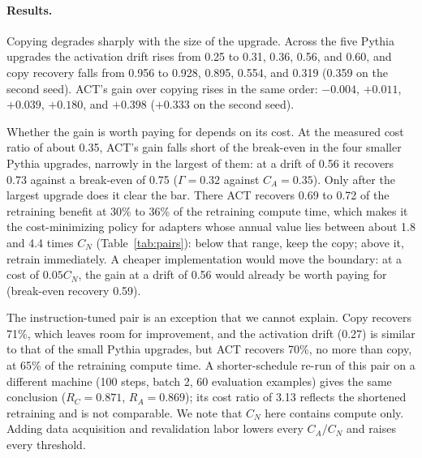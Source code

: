 \documentclass[ijoc,nonblindrev]{informs4}
\begin{document}
\paragraph{Results.} Copying degrades sharply with the size of the upgrade. Across the five Pythia upgrades the activation drift rises from 0.25 to 0.31, 0.36, 0.56, and 0.60, and
copy recovery falls from 0.956 to 0.928, 0.895, 0.554, and 0.319 (0.359 on the second seed). ACT's gain over copying rises in the same order: $-0.004$, $+0.011$, $+0.039$, $+0.180$, and $+0.398$ ($+0.333$ on the second seed).

Whether the gain is worth paying for depends on its cost. At the measured cost ratio of about 0.35, ACT's gain falls short of the break-even in the four smaller Pythia upgrades, narrowly in the largest of them: at a drift of 0.56 it recovers 0.73 against a break-even of 0.75 ($\Gamma=0.32$ against $C_A=0.35$).
Only after the largest upgrade does it clear the bar. There ACT recovers 0.69 to 0.72 of the retraining benefit at 30\% to 36\% of the retraining compute time, which makes it the cost-minimizing policy for adapters
whose annual value lies between about 1.8 and 4.4 times $C_N$ (Table~\ref{tab:pairs}): below that range, keep the copy; above it, retrain immediately. A cheaper implementation would move the boundary: at a cost of $0.05C_N$, the gain at a drift of 0.56 would already be worth paying for (break-even recovery 0.59).

The instruction-tuned pair is an exception that we cannot explain. Copy recovers 71\%, which leaves room for improvement, and the activation drift (0.27) is similar to that of the small Pythia upgrades, but ACT recovers 70\%, no more than copy, at 65\% of the retraining compute time.
A shorter-schedule re-run of this pair on a different machine (100 steps, batch 2, 60 evaluation examples) gives the same conclusion ($R_C=0.871$, $R_A=0.869$); its cost ratio of 3.13 reflects the shortened retraining and is not comparable.
We note that $C_N$ here contains compute only. Adding data acquisition and revalidation labor lowers every $C_A/C_N$ and raises every threshold.
\end{document}
